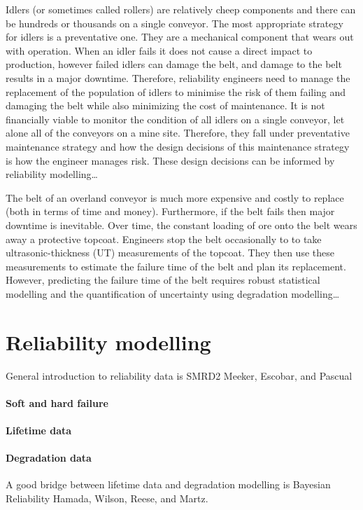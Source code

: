 Idlers (or sometimes called rollers) are relatively cheep components and there can be hundreds or thousands on a single conveyor. The most appropriate strategy for idlers is a preventative one. They are a mechanical component that wears out with operation. When an idler fails it does not cause a direct impact to production, however failed idlers can damage the belt, and damage to the belt results in a major downtime. Therefore, reliability engineers need to manage the replacement of the population of idlers to minimise the risk of them failing and damaging the belt while also minimizing the cost of maintenance. It is not financially viable to monitor the condition of all idlers on a single conveyor, let alone all of the conveyors on a mine site. Therefore, they fall under preventative maintenance strategy and how the design decisions of this maintenance strategy is how the engineer manages risk. These design decisions can be informed by reliability modelling\dots

The belt of an overland conveyor is much more expensive and costly to replace (both in terms of time and money). Furthermore, if the belt fails then major downtime is inevitable. Over time, the constant loading of ore onto the belt wears away a protective topcoat. Engineers stop the belt occasionally to to take ultrasonic-thickness (UT) measurements of the topcoat. They then use these measurements to estimate the failure time of the belt and plan its replacement. However, predicting the failure time of the belt requires robust statistical modelling and the quantification of uncertainty using degradation modelling\dots

\section{Reliability modelling}
\label{sec:reliability}

General introduction to reliability data is SMRD2 Meeker, Escobar, and Pascual

\paragraph*{Soft and hard failure}

\paragraph*{Lifetime data}

\paragraph*{Degradation data}
A good bridge between lifetime data and degradation modelling is Bayesian Reliability Hamada, Wilson, Reese, and Martz.

